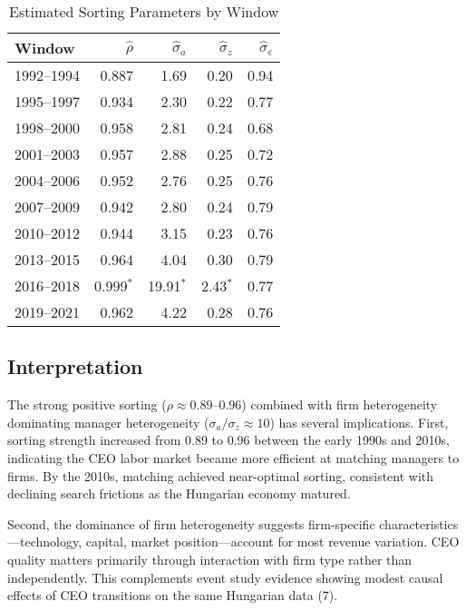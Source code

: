 \documentclass[9pt,twocolumn,twoside]{pnas-new}
\begin{document}
\begin{table}[t]
\centering
\caption{Estimated Sorting Parameters by Window}
\label{tab:estimates}
\begin{tabular}{lrrrr}
\toprule
Window & $\widehat\rho$ & $\widehat\sigma_a$ & $\widehat\sigma_z$ & $\widehat\sigma_\varepsilon$ \\
\midrule
1992--1994 & 0.887 & 1.69 & 0.20 & 0.94 \\
1995--1997 & 0.934 & 2.30 & 0.22 & 0.77 \\
1998--2000 & 0.958 & 2.81 & 0.24 & 0.68 \\
2001--2003 & 0.957 & 2.88 & 0.25 & 0.72 \\
2004--2006 & 0.952 & 2.76 & 0.25 & 0.76 \\
2007--2009 & 0.942 & 2.80 & 0.24 & 0.79 \\
2010--2012 & 0.944 & 3.15 & 0.23 & 0.76 \\
2013--2015 & 0.964 & 4.04 & 0.30 & 0.79 \\
2016--2018 & 0.999$^*$ & 19.91$^*$ & 2.43$^*$ & 0.77 \\
2019--2021 & 0.962 & 4.22 & 0.28 & 0.76 \\
\bottomrule
\end{tabular}

\end{table}

\subsection*{Interpretation}
The strong positive sorting ($\rho \approx 0.89$--0.96) combined with firm heterogeneity dominating manager heterogeneity ($\sigma_a/\sigma_z \approx 10$) has several implications. First, sorting strength increased from 0.89 to 0.96 between the early 1990s and 2010s, indicating the CEO labor market became more efficient at matching managers to firms. By the 2010s, matching achieved near-optimal sorting, consistent with declining search frictions as the Hungarian economy matured.

Second, the dominance of firm heterogeneity suggests firm-specific characteristics---technology, capital, market position---account for most revenue variation. CEO quality matters primarily through interaction with firm type rather than independently. This complements event study evidence showing modest causal effects of CEO transitions on the same Hungarian data (7).
\end{document}
